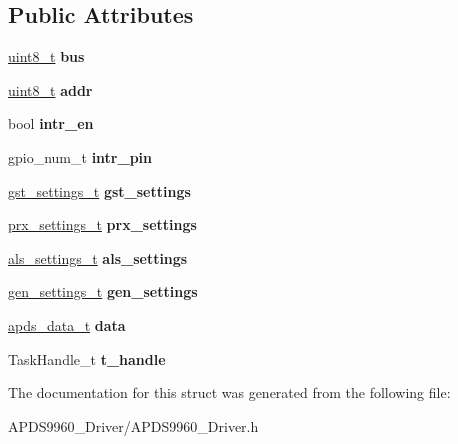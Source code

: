 \subsection*{Public Attributes}
\begin{DoxyCompactItemize}
\item 
\mbox{\label{structAPDS9960__Driver_a5706f944c7150a6908dbb382ee774cd6}} 
\hyperlink{vl53l0x__types_8h_aba7bc1797add20fe3efdf37ced1182c5}{uint8\+\_\+t} {\bfseries bus}
\item 
\mbox{\label{structAPDS9960__Driver_ad6ce95140873f0ed5e3bbf834595cbe7}} 
\hyperlink{vl53l0x__types_8h_aba7bc1797add20fe3efdf37ced1182c5}{uint8\+\_\+t} {\bfseries addr}
\item 
\mbox{\label{structAPDS9960__Driver_ab764a56d9483a0f79f32c7f436aa8c4d}} 
bool {\bfseries intr\+\_\+en}
\item 
\mbox{\label{structAPDS9960__Driver_ae954e4fa53a890e1c7c616f44b32d259}} 
gpio\+\_\+num\+\_\+t {\bfseries intr\+\_\+pin}
\item 
\mbox{\label{structAPDS9960__Driver_a34f4d013dcbb5e0f83267d7cc9a75d34}} 
\hyperlink{structgst__settings__t}{gst\+\_\+settings\+\_\+t} {\bfseries gst\+\_\+settings}
\item 
\mbox{\label{structAPDS9960__Driver_a5a40dd89f78e16cd964a538395559d0c}} 
\hyperlink{structprx__settings__t}{prx\+\_\+settings\+\_\+t} {\bfseries prx\+\_\+settings}
\item 
\mbox{\label{structAPDS9960__Driver_ae53c09a13524750c25ee9f3c3dfe740a}} 
\hyperlink{structals__settings__t}{als\+\_\+settings\+\_\+t} {\bfseries als\+\_\+settings}
\item 
\mbox{\label{structAPDS9960__Driver_a3ce432690f1b2dc436fedb68443c3cb4}} 
\hyperlink{structgen__settings__t}{gen\+\_\+settings\+\_\+t} {\bfseries gen\+\_\+settings}
\item 
\mbox{\label{structAPDS9960__Driver_a4a660d3a469157e68f69ced004bee138}} 
\hyperlink{structapds__data__t}{apds\+\_\+data\+\_\+t} {\bfseries data}
\item 
\mbox{\label{structAPDS9960__Driver_a2335b853e3a6f2f3c3abd21d4bad28c3}} 
Task\+Handle\+\_\+t {\bfseries t\+\_\+handle}
\end{DoxyCompactItemize}


The documentation for this struct was generated from the following file\+:\begin{DoxyCompactItemize}
\item 
A\+P\+D\+S9960\+\_\+\+Driver/A\+P\+D\+S9960\+\_\+\+Driver.\+h\end{DoxyCompactItemize}
